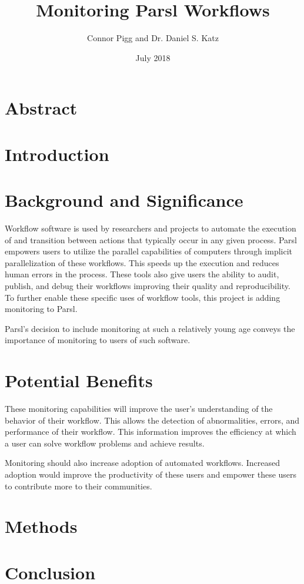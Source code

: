 \documentclass{article}
\title{Monitoring Parsl Workflows}
\author{Connor Pigg and Dr. Daniel S. Katz}
\date{July 2018}
\begin{document}
\maketitle

\section{Abstract}

\pagebreak

\section{Introduction}


\section{Background and Significance}
Workflow software is used by researchers and projects to automate the execution of and transition between actions that typically occur in any given process.
Parsl empowers users to utilize the parallel capabilities of computers through implicit parallelization of these workflows.
This speeds up the execution and reduces human errors in the process.
These tools also give users the ability to audit, publish, and debug their workflows improving their quality and reproducibility.
To further enable these specific uses of workflow tools, this project is adding monitoring to Parsl.

Parsl's decision to include monitoring at such a relatively young age conveys the importance of monitoring to users of such software.

\section{Potential Benefits}
These monitoring capabilities will improve the user's understanding of the behavior of their workflow.
This allows the detection of abnormalities, errors, and performance of their workflow.
This information improves the efficiency at which a user can solve workflow problems and achieve results.

Monitoring should also increase adoption of automated workflows.
Increased adoption would improve the productivity of these users and empower these users to contribute more to their communities.

\section{Methods}


\section{Conclusion}




\end{document}
